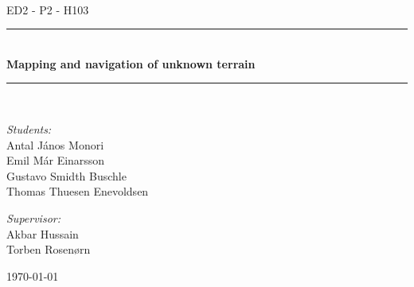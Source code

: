 \newcommand{\HRule}{\rule{\linewidth}{0.5 mm}}
\begin{titlepage}

\begin{center}
\\[0.5cm]

\textsc{\Large ED2 - P2 - H103}\\[0.6cm]

\HRule \\[0.9cm]
{ \Huge \bfseries Mapping and navigation of unknown terrain }\\[0.4cm]

\HRule \\[0.5cm]


\begin{minipage}{0.49\textwidth}
\begin{flushleft} \large
\emph{Students:}\\
Antal János Monori\\
Emil Már Einarsson\\
Gustavo Smidth Buschle\\
Thomas Thuesen Enevoldsen
\end{flushleft}
\end{minipage}
\begin{minipage}{0.49\textwidth}
\begin{flushright} \large
\emph{Supervisor:} \\
Akbar Hussain\\
Torben Rosenørn
\end{flushright}
\end{minipage}

\vfill

{\large \today}



\end{center}

\end{titlepage}